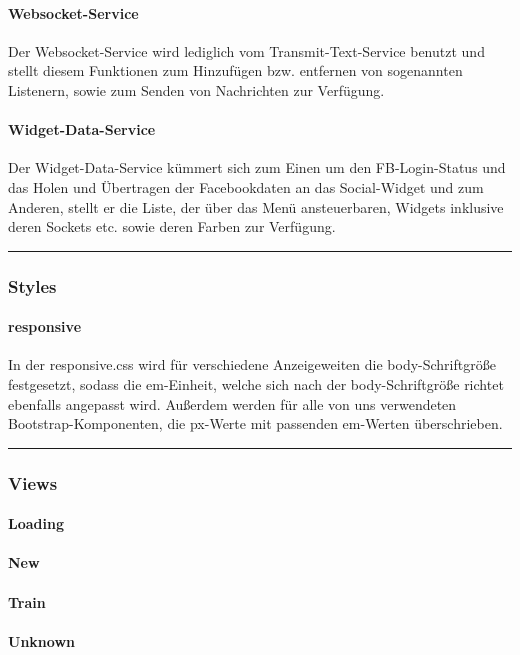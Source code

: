 \documentclass[10pt,a4paper]{report}
\newcommand{\code}[1]{{\fontfamily{cmvtt}\selectfont #1}}
\newcommand{\HRule}{\rule{\linewidth}{0.1pt}} %
\begin{document}
				\paragraph{Websocket-Service}
					Der Websocket-Service wird lediglich vom Transmit-Text-Service benutzt und stellt diesem Funktionen zum Hinzufügen bzw. entfernen von sogenannten Listenern, sowie zum Senden von Nachrichten zur Verfügung.
				\paragraph{Widget-Data-Service}
					Der Widget-Data-Service kümmert sich zum Einen um den FB-Login-Status und das Holen und Übertragen der Facebookdaten an das Social-Widget und zum Anderen, stellt er die Liste, der über das Menü ansteuerbaren, Widgets inklusive deren Sockets etc. sowie deren Farben zur Verfügung.\\
					\HRule
			\subsubsection{Styles}
				\paragraph{responsive}
					In der responsive.css wird für verschiedene Anzeigeweiten die body-Schriftgröße festgesetzt, sodass die \code{em}-Einheit, welche sich nach der body-Schriftgröße richtet ebenfalls angepasst wird. Außerdem werden für alle von uns verwendeten Bootstrap-Komponenten, die \code{px}-Werte mit passenden \code{em}-Werten überschrieben.\\
					\HRule
			\subsubsection{Views}
				\paragraph{Loading}
				\paragraph{New}
				\paragraph{Train}
				\paragraph{Unknown}
\end{document}
